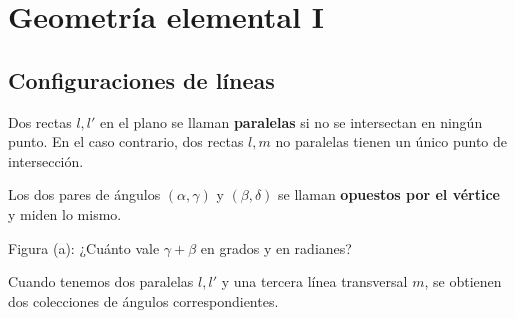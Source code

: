 \chapter{Geometría elemental I}

\section{Configuraciones de líneas}

Dos rectas $l,l'$ en el plano se llaman {\bf paralelas} si no se intersectan en ningún punto. En el caso contrario, dos rectas $l,m$ no paralelas tienen un único punto de intersección.

Los dos pares de ángulos $(\alpha,\gamma)$ y $(\beta,\delta)$ se llaman {\bf opuestos por el vértice} y miden lo mismo.

\begin{ejercicio}
Figura (a): ¿Cuánto vale $\gamma+\beta$ en grados y en radianes?
\end{ejercicio}

Cuando tenemos dos paralelas $l, l'$ y una tercera línea transversal $m$, se obtienen dos colecciones de ángulos correspondientes.

